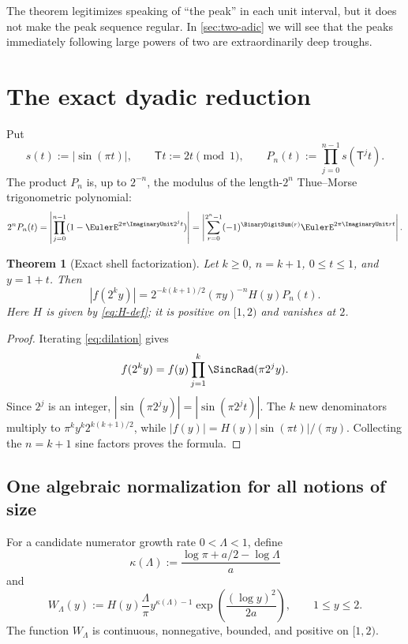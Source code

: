 \documentclass[11pt,oneside]{article}
\newtheorem{theorem}{Theorem}[section]
\theoremstyle{definition}
\theoremstyle{remark}
\newcommand{\T}{\mathsf T}
\begin{document}
The theorem legitimizes speaking of ``the peak'' in each unit interval, but it
does not make the peak sequence regular.  In \cref{sec:two-adic} we will see
that the peaks immediately following large powers of two are extraordinarily
deep troughs.

\section{The exact dyadic reduction}
\label{sec:factorization}

Put
\begin{equation}
 s(t):=|\sin(\pi t)|,
 \qquad
 \T t:=2t\pmod1,
 \qquad
 P_n(t):=\prod_{j=0}^{n-1}s(\T^jt).
 \label{eq:Pn}
\end{equation}
The product $P_n$ is, up to $2^{-n}$, the modulus of the length-$2^n$
Thue--Morse trigonometric polynomial:
\begin{equation}
 2^nP_n(t)=
 \left|\prod_{j=0}^{n-1}(1-\EulerE^{2\pi\ImaginaryUnit2^jt})\right|
 =\left|\sum_{r=0}^{2^n-1}(-1)^{\BinaryDigitSum(r)}\EulerE^{2\pi\ImaginaryUnit rt}\right|.
 \label{eq:TM-polynomial}
\end{equation}

\begin{theorem}[Exact shell factorization]
\label{thm:factorization}
Let $k\ge0$, $n=k+1$, $0\le t\le1$, and $y=1+t$.  Then
\begin{equation}
 \boxed{
 |f(2^ky)|
 =2^{-k(k+1)/2}(\pi y)^{-n}H(y)P_n(t).}
 \label{eq:exact-factorization}
\end{equation}
Here $H$ is given by \eqref{eq:H-def}; it is positive on $[1,2)$ and vanishes
at $2$.
\end{theorem}

\begin{proof}
Iterating \eqref{eq:dilation} gives
\[
 f(2^ky)=f(y)\prod_{j=1}^{k}\SincRad(\pi2^jy).
\]
Since $2^j$ is an integer,
$|\sin(\pi2^jy)|=|\sin(\pi2^jt)|$.  The $k$ new denominators multiply to
$\pi^ky^k2^{k(k+1)/2}$, while
$|f(y)|=H(y)|\sin(\pi t)|/(\pi y)$.  Collecting the $n=k+1$ sine factors
proves the formula.
\end{proof}

\subsection{One algebraic normalization for all notions of size}

For a candidate numerator growth rate $0<\Lambda<1$, define
\begin{equation}
 \kappa(\Lambda):=
 \frac{\log\pi+a/2-\log\Lambda}{a}
 \label{eq:kappa-Lambda}
\end{equation}
and
\begin{equation}
 W_\Lambda(y):=
 H(y)\frac{\Lambda}{\pi}
 y^{\kappa(\Lambda)-1}
 \exp\!\left(\frac{(\log y)^2}{2a}\right),
 \qquad 1\le y\le2.
 \label{eq:W-Lambda}
\end{equation}
The function $W_\Lambda$ is continuous, nonnegative, bounded, and positive on
$[1,2)$.
\end{document}
